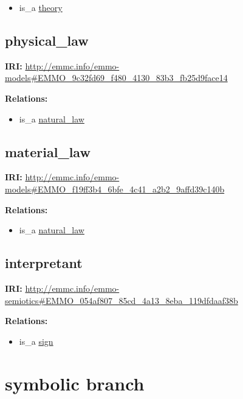 \documentclass[a4paper,]{report}
\providecommand{\tightlist}{%
  \setlength{\itemsep}{0pt}\setlength{\parskip}{0pt}}
\begin{document}
\begin{itemize}
\tightlist
\item
  is\_a \protect\hyperlink{theory}{theory}
\end{itemize}

\hypertarget{physical_law}{%
\subsection{physical\_law}\label{physical_law}}

\textbf{IRI:}
\url{http://emmc.info/emmo-models\#EMMO_9c32fd69_f480_4130_83b3_fb25d9face14}

\textbf{Relations:}

\begin{itemize}
\tightlist
\item
  is\_a \protect\hyperlink{natural_law}{natural\_law}
\end{itemize}

\hypertarget{material_law}{%
\subsection{material\_law}\label{material_law}}

\textbf{IRI:}
\url{http://emmc.info/emmo-models\#EMMO_f19ff3b4_6bfe_4c41_a2b2_9affd39c140b}

\textbf{Relations:}

\begin{itemize}
\tightlist
\item
  is\_a \protect\hyperlink{natural_law}{natural\_law}
\end{itemize}

\hypertarget{interpretant}{%
\subsection{interpretant}\label{interpretant}}

\textbf{IRI:}
\url{http://emmc.info/emmo-semiotics\#EMMO_054af807_85cd_4a13_8eba_119dfdaaf38b}

\textbf{Relations:}

\begin{itemize}
\tightlist
\item
  is\_a \protect\hyperlink{sign}{sign}
\end{itemize}

\hypertarget{symbolic-branch}{%
\section{symbolic branch}\label{symbolic-branch}}
\end{document}
